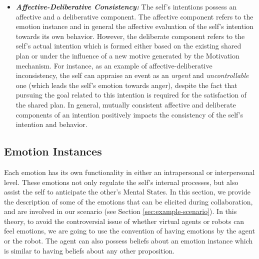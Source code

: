 \documentclass[12pt]{report}
\begin{document}
\begin{itemize}
  \item \textbf{\textit{Affective-Deliberative Consistency:}} The self's
  intentions possess an affective and a deliberative component. The affective
  component refers to the emotion instance and in general the affective
  evaluation of the self's intention towards its own behavior. However, the
  deliberate component refers to the self's actual intention which is formed
  either based on the existing shared plan or under the influence of a new
  motive generated by the Motivation mechanism. For instance, as an example of
  affective-deliberative inconsistency, the self can appraise an event as an
  \textit{urgent} and \textit{uncontrollable} one (which leads the self's
  emotion towards anger), despite the fact that pursuing the goal related
  to this intention is required for the satisfaction of the shared plan. In
  general, mutually consistent affective and deliberate components of an
  intention positively impacts the consistency of the self's intention and
  behavior.
\end{itemize}

\subsection{Emotion Instances}
\label{section-emotion-instances}

Each emotion has its own functionality in either an intrapersonal or
interpersonal level. These emotions not only regulate the self's internal
processes, but also assist the self to anticipate the other's Mental States. In
this section, we provide the description of some of the emotions that can be
elicited during collaboration, and are involved in our scenario (see Section
\ref{sec:example-scenario}). In this theory, to avoid the controversial issue of
whether virtual agents or robots can feel emotions, we are going to use the
convention of having emotions by the agent or the robot. The agent can also
possess beliefs about an emotion instance which is similar to having beliefs
about any other proposition.
\end{document}
